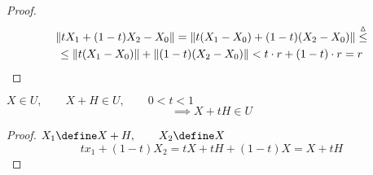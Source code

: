 \begin{proof}
	\begin{multline*}
		\left\|{tX_1 + (1 - t)X_2 - X_0}\right\| = \left\|{t(X_1 - X_0) + (1 - t)(X_2 - X_0)}\right\| \stackrel\vartriangle\le \\
		\le \left\|{t(X_1 - X_0)}\right\| + \left\|{(1 - t)(X_2 - X_0)}\right\| < t \cdot r + (1 - t) \cdot r = r
	\end{multline*}
\end{proof}

\begin{implication}
	$ X \in U, \qquad X + H \in U, \qquad 0 < t < 1 $
	$$ \implies X + tH \in U $$
\end{implication}

\begin{proof}
	$ X_1 \define X + H, \qquad X_2 \define X $
	$$ tx_1 + (1 - t)X_2 = tX + tH + (1 - t)X = X + tH $$
\end{proof}

